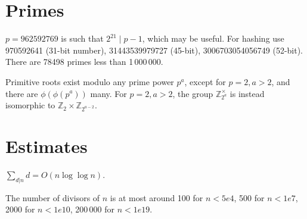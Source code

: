 \section{Primes}
	$p=962592769$ is such that $2^{21} \mid p-1$, which may be useful. For hashing
	use 970592641 (31-bit number), 31443539979727 (45-bit), 3006703054056749
	(52-bit). There are 78498 primes less than 1\,000\,000.

	Primitive roots exist modulo any prime power $p^a$, except for $p = 2, a > 2$, and there are $\phi(\phi(p^a))$ many.
	For $p = 2, a > 2$, the group $\mathbb Z_{2^a}^\times$ is instead isomorphic to $\mathbb Z_2 \times \mathbb Z_{2^{a-2}}$.

\section{Estimates}
	$\sum_{d|n} d = O(n \log \log n)$.

	The number of divisors of $n$ is at most around 100 for $n < 5e4$, 500 for $n < 1e7$, 2000 for $n < 1e10$, 200\,000 for $n < 1e19$.

